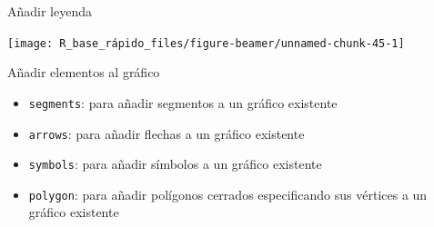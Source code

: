 \documentclass[
  ignorenonframetext,
  aspectratio=169]{beamer}
\providecommand{\tightlist}{%
  \setlength{\itemsep}{0pt}\setlength{\parskip}{0pt}}
\begin{document}
\begin{frame}{Añadir leyenda}
\label{auxf1adir-leyenda-1}
\begin{center}\texttt{[image: R\_base\_rápido\_files/figure-beamer/unnamed-chunk-45-1]} \end{center}
\end{frame}

\begin{frame}[fragile]{Añadir elementos al gráfico}
\label{auxf1adir-elementos-al-gruxe1fico-4}
\begin{itemize}
\tightlist
\item
  \texttt{segments}: para añadir segmentos a un gráfico existente
\item
  \texttt{arrows}: para añadir flechas a un gráfico existente
\item
  \texttt{symbols}: para añadir símbolos a un gráfico existente
\item
  \texttt{polygon}: para añadir polígonos cerrados especificando sus
  vértices a un gráfico existente
\end{itemize}
\end{frame}
\end{document}
